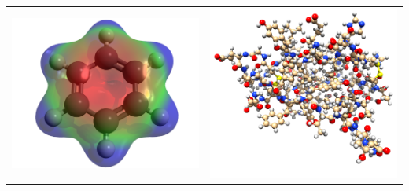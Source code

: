\documentclass[portrait,kjemiDim,fontscale=0.292]{baposter}
\begin{document}
\begin{poster}
{     \begin{tabular}{rl}
  \includegraphics[scale=0.06]{benzene-density-esp1.png} &   \includegraphics[scale=0.08]{insulin_TKJ.png} \\
       \end{tabular}



}
\end{poster}
\end{document}
